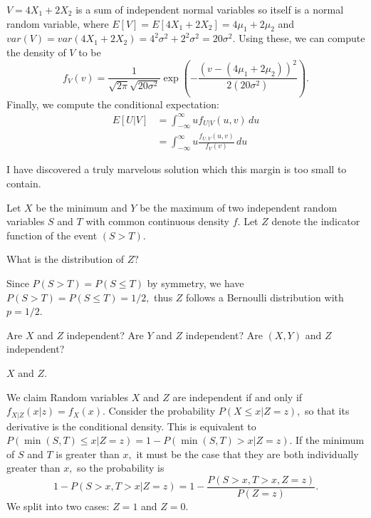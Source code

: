 \documentclass{article}
\begin{document}
\begin{enumerate}
\begin{enumerate}
\begin{soln}
				$V=4X_1+2X_2$ is a sum of independent normal variables so itself is a normal random variable, where $E[V]=E[4X_1+2X_2]=4\mu_1+2\mu_2$ and $var(V)=var(4X_1+2X_2)=4^2\sigma^2+2^2\sigma^2=20\sigma^2.$ Using these, we can compute the density of $V$ to be \[f_V(v)=\frac{1}{\sqrt{2\pi}\sqrt{20\sigma^2}}\exp{\left( -\frac{(v-(4\mu_1+2\mu_2))^2}{2(20\sigma^2)} \right)}. \] Finally, we compute the conditional expectation:
				\begin{align*}
					E[U|V] &= \int_{-\infty}^\infty u f_{U|V}(u, v)\, du \\
					&= \int_{-\infty}^\infty u\frac{f_{U, V}(u, v)}{f_V(v)}\, du
				\end{align*}

				I have discovered a truly marvelous solution which this margin is too small to contain. 

			\end{soln}
	\end{enumerate}

	\newpage

	\ii Let $X$ be the minimum and $Y$ be the maximum of two independent random variables $S$ and $T$ with common continuous density $f.$ Let $Z$ denote the indicator function of the event $(S>T).$ 

	\begin{enumerate}
		\ii What is the distribution of $Z?$
			\begin{soln}
				Since $P(S>T)=P(S\le T)$ by symmetry, we have $P(S>T)=P(S\le T)=1/2,$ thus $Z$ follows a Bernoulli distribution with $p=1/2.$ 
			\end{soln}

		\ii Are $X$ and $Z$ independent? Are $Y$ and $Z$ independent? Are $(X, Y)$ and $Z$ independent?
			
			\begin{enumerate}
					\ii $X$ and $Z.$

					\begin{soln}

						We claim  Random variables $X$ and $Z$ are independent if and only if $f_{X|Z}(x|z)=f_X(x).$ Consider the probability $P(X\le x|Z=z),$ so that its derivative is the conditional density. This is equivalent to $P(\min{(S, T)}\le x|Z=z)=1-P(\min{(S, T)}>x|Z=z).$ If the minimum of $S$ and $T$ is greater than $x,$ it must be the case that they are both individually greater than $x,$ so the probability is \[1-P(S>x, T>x|Z=z)=1-\frac{P(S>x, T>x, Z=z)}{P(Z=z)}.\] We split into two cases: $Z=1$ and $Z=0.$ 


\end{soln}
\end{enumerate}
\end{enumerate}
\end{enumerate}
\end{document}
